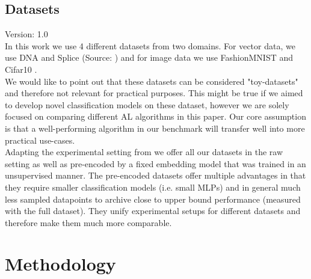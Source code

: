 \documentclass[]{article}
\begin{document}
\subsection{Datasets}
{\color{red} Version: 1.0}\\
In this work we use 4 different datasets from two domains.
For vector data, we use DNA and Splice (Source: \cite{libsvmtools}) and for image data we use FashionMNIST \cite{xiao2017fashion} and Cifar10 \cite{krizhevsky2009learning}. \\
We would like to point out that these datasets can be considered "toy-datasets" and therefore not relevant for practical purposes.
This might be true if we aimed to develop novel classification models on these dataset, however we are solely focused on comparing different AL algorithms in this paper.
Our core assumption is that a well-performing algorithm in our benchmark will transfer well into more practical use-cases. \\ [1mm]
Adapting the experimental setting from \cite{hacohen2022active} we offer all our datasets in the raw setting as well as pre-encoded by a fixed embedding model that was trained in an unsupervised manner. 
The pre-encoded datasets offer multiple advantages in that they require smaller classification models (i.e. small MLPs) and in general much less sampled datapoints to archive close to upper bound performance (measured with the full dataset).
They unify experimental setups for different datasets and therefore make them much more comparable.

\section{Methodology}

\end{document}
